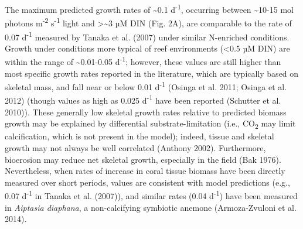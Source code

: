 \documentclass[]{elsarticle} %
\begin{document}
The maximum predicted growth rates of \textasciitilde{}0.1
d\textsuperscript{-1}, occurring between \textasciitilde{}10-15 mol
photons m\textsuperscript{-2} s\textsuperscript{-1} light and
\textgreater{}\textasciitilde{}3 µM DIN (Fig. 2A), are comparable to the
rate of 0.07 d\textsuperscript{-1} measured by Tanaka et al. (2007)
under similar N-enriched conditions. Growth under conditions more
typical of reef environments (\textless{}0.5 µM DIN) are within the
range of \textasciitilde{}0.01-0.05 d\textsuperscript{-1}; however,
these values are still higher than most specific growth rates reported
in the literature, which are typically based on skeletal mass, and fall
near or below 0.01 d\textsuperscript{-1} (Osinga et al. 2011; Osinga et
al. 2012) (though values as high as 0.025 d\textsuperscript{-1} have
been reported (Schutter et al. 2010)). These generally low skeletal
growth rates relative to predicted biomass growth may be explained by
differential substrate-limitation (i.e., CO\textsubscript{2} may limit
calcification, which is not present in the model); indeed, tissue and
skeletal growth may not always be well correlated (Anthony 2002).
Furthermore, bioerosion may reduce net skeletal growth, especially in
the field (Bak 1976). Nevertheless, when rates of increase in coral
tissue biomass have been directly measured over short periods, values
are consistent with model predictions (e.g., 0.07 d\textsuperscript{-1}
in Tanaka et al. (2007)), and similar rates (0.04 d\textsuperscript{-1})
have been measured in \emph{Aiptasia diaphana}, a non-calcifying
symbiotic anemone (Armoza-Zvuloni et al. 2014).
\end{document}
